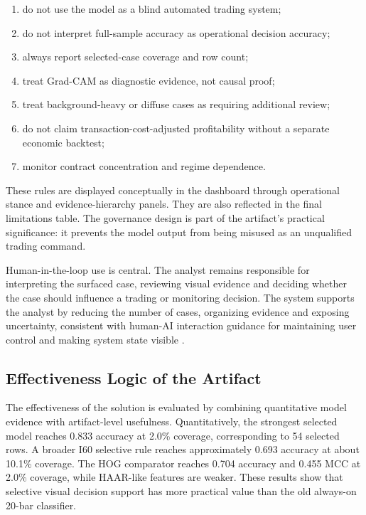 \begin{enumerate}
    \item do not use the model as a blind automated trading system;
    \item do not interpret full-sample accuracy as operational decision accuracy;
    \item always report selected-case coverage and row count;
    \item treat Grad-CAM as diagnostic evidence, not causal proof;
    \item treat background-heavy or diffuse cases as requiring additional review;
    \item do not claim transaction-cost-adjusted profitability without a separate economic backtest;
    \item monitor contract concentration and regime dependence.
\end{enumerate}

These rules are displayed conceptually in the dashboard through operational stance and evidence-hierarchy panels. They are also reflected in the final limitations table. The governance design is part of the artifact's practical significance: it prevents the model output from being misused as an unqualified trading command.

Human-in-the-loop use is central. The analyst remains responsible for interpreting the surfaced case, reviewing visual evidence and deciding whether the case should influence a trading or monitoring decision. The system supports the analyst by reducing the number of cases, organizing evidence and exposing uncertainty, consistent with human-AI interaction guidance for maintaining user control and making system state visible \cite{amershi_hai_guidelines}.

\subsection{Effectiveness Logic of the Artifact}
\label{subsec:artifact_effectiveness}

The effectiveness of the solution is evaluated by combining quantitative model evidence with artifact-level usefulness. Quantitatively, the strongest selected model reaches 0.833 accuracy at 2.0\% coverage, corresponding to 54 selected rows. A broader I60 selective rule reaches approximately 0.693 accuracy at about 10.1\% coverage. The HOG comparator reaches 0.704 accuracy and 0.455 MCC at 2.0\% coverage, while HAAR-like features are weaker. These results show that selective visual decision support has more practical value than the old always-on 20-bar classifier.

